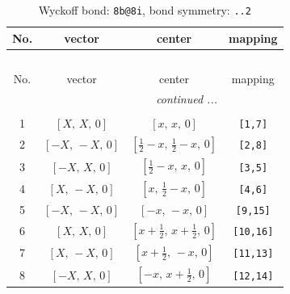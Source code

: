 \documentclass[fleqn,8pt]{jsarticle}
\begin{document}
\begin{longtable}{cccc}
\caption{Wyckoff bond: {\tt 8b@8i}, bond symmetry: {\tt ..2}}
 \\
 \hline \hline
No. & vector & center & mapping \\ \hline \endfirsthead

\multicolumn{3}{l}{\tablename\ \thetable{}} \\
 \hline \hline
No. & vector & center & mapping \\ \hline \endhead

 \hline \hline
\multicolumn{3}{r}{\footnotesize\it continued ...} \\ \endfoot

 \hline \hline
\multicolumn{3}{r}{} \\ \endlastfoot

1 & $\left[ X,\, X,\, 0 \right]$ & $\left[ x,\, x,\, 0 \right]$ & {\tt [1,7]} \\ \hline
2 & $\left[ - X,\, - X,\, 0 \right]$ & $\left[ \frac{1}{2} - x,\, \frac{1}{2} - x,\, 0 \right]$ & {\tt [2,8]} \\ \hline
3 & $\left[ - X,\, X,\, 0 \right]$ & $\left[ \frac{1}{2} - x,\, x,\, 0 \right]$ & {\tt [3,5]} \\ \hline
4 & $\left[ X,\, - X,\, 0 \right]$ & $\left[ x,\, \frac{1}{2} - x,\, 0 \right]$ & {\tt [4,6]} \\ \hline
5 & $\left[ - X,\, - X,\, 0 \right]$ & $\left[ - x,\, - x,\, 0 \right]$ & {\tt [9,15]} \\ \hline
6 & $\left[ X,\, X,\, 0 \right]$ & $\left[ x + \frac{1}{2},\, x + \frac{1}{2},\, 0 \right]$ & {\tt [10,16]} \\ \hline
7 & $\left[ X,\, - X,\, 0 \right]$ & $\left[ x + \frac{1}{2},\, - x,\, 0 \right]$ & {\tt [11,13]} \\ \hline
8 & $\left[ - X,\, X,\, 0 \right]$ & $\left[ - x,\, x + \frac{1}{2},\, 0 \right]$ & {\tt [12,14]} \\
\end{longtable}
\renewcommand{\arraystretch}{1.2}
\end{document}
